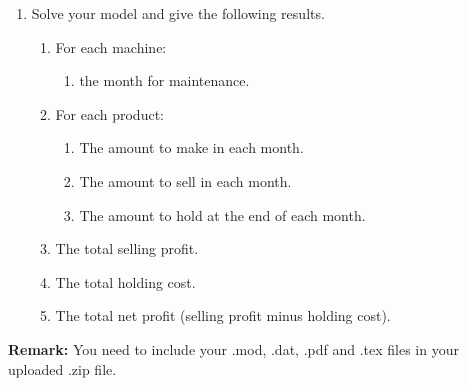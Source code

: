 \documentclass[12pt,a4paper]{article}
\theoremstyle{definition}
\begin{document}
\begin{enumerate}
\begin{enumerate}
    \item
    Solve your model and give the following results.
    \begin{enumerate}
    \item
    For each machine:
    \begin{enumerate}
    \item
    the month for maintenance.
    \end{enumerate}
    \item
    For each product:
    \begin{enumerate}
    \item
    The amount to make in each month.
    \item
    The amount to sell in each month.
    \item
    The amount to hold at the end of each month.
    \end{enumerate}
    \item
    The total selling profit.
    \item
    The total holding cost.
    \item
    The total net profit (selling profit minus holding cost).
    \end{enumerate}
    \end{enumerate}

\end{enumerate}

\vspace{20pt}

\textbf{Remark:} You need to include your .mod, .dat, .pdf and .tex files in your uploaded .zip file.

\end{document}
